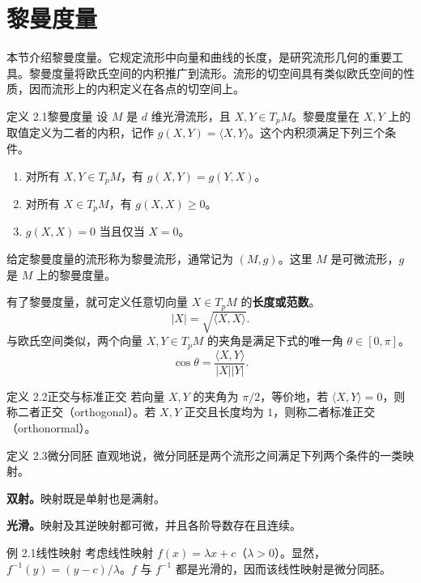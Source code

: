 \section{黎曼度量}
本节介绍黎曼度量。它规定流形中向量和曲线的长度，是研究流形几何的重要工具。黎曼度量将欧氏空间的内积推广到流形。流形的切空间具有类似欧氏空间的性质，因而流形上的内积定义在各点的切空间上。

\begin{statement}{定义 2.1}{黎曼度量}
设 $M$ 是 $d$ 维光滑流形，且 $X,Y\in T_pM$。黎曼度量在 $X,Y$ 上的取值定义为二者的内积，记作 $g(X,Y)=\langle X,Y\rangle$。这个内积须满足下列三个条件。
\begin{enumerate}
  \item 对所有 $X,Y\in T_pM$，有 $g(X,Y)=g(Y,X)$。
  \item 对所有 $X\in T_pM$，有 $g(X,X)\geq 0$。
  \item $g(X,X)=0$ 当且仅当 $X=0$。
\end{enumerate}

给定黎曼度量的流形称为黎曼流形，通常记为 $(M,g)$。这里 $M$ 是可微流形，$g$ 是 $M$ 上的黎曼度量。

有了黎曼度量，就可定义任意切向量 $X\in T_pM$ 的\textbf{长度或范数}。
\[
  |X|=\sqrt{\langle X,X\rangle}.
\]
与欧氏空间类似，两个向量 $X,Y\in T_pM$ 的夹角是满足下式的唯一角 $\theta\in[0,\pi]$。
\[
  \cos\theta=\frac{\langle X,Y\rangle}{|X||Y|}.
\]
\end{statement}

\begin{statement}{定义 2.2}{正交与标准正交}
若向量 $X,Y$ 的夹角为 $\pi/2$，等价地，若 $\langle X,Y\rangle=0$，则称二者正交（orthogonal）。若 $X,Y$ 正交且长度均为 $1$，则称二者标准正交（orthonormal）。
\end{statement}

\begin{statement}{定义 2.3}{微分同胚}
直观地说，微分同胚是两个流形之间满足下列两个条件的一类映射。

\textbf{双射。}映射既是单射也是满射。

\textbf{光滑。}映射及其逆映射都可微，并且各阶导数存在且连续。
\end{statement}

\begin{statement}{例 2.1}{线性映射}
考虑线性映射 $f(x)=\lambda x+c$（$\lambda>0$）。显然，$f^{-1}(y)=(y-c)/\lambda$。$f$ 与 $f^{-1}$ 都是光滑的，因而该线性映射是微分同胚。
\end{statement}


